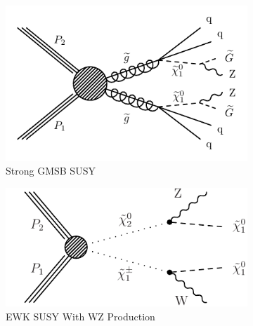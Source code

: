     \begin{figure}[!h]
      \centering
      \begin{subfigure}[b]{0.49\textwidth}
        \includegraphics[width=\textwidth]{figures/diagrams/T5ZZ.pdf} 
        \caption{Strong GMSB SUSY}
        \label{fig:t5zz_diagram_interpretations}
      \end{subfigure}
      \begin{subfigure}[b]{0.49\textwidth}
        \includegraphics[width=\textwidth]{figures/diagrams/TChiWZ.pdf}
        \caption{EWK SUSY With WZ Production}
        \label{fig:tchiwz_diagram_interpretations}
      \end{subfigure} \\
      \begin{subfigure}[b]{0.49\textwidth}

\end{subfigure}
\end{figure}
